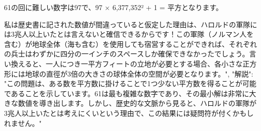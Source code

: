 \documentclass[10pt,a4paper,oneside,openany]{ltjsbook}
\begin{document}
\begin{tcolorbox}[colback=softblue,colframe=primaryblue,title=\textbf{第 129 問：THE BATTLE OF HASTINGS.},arc=2mm,boxrule=1pt,breakable]
{61の回に難しい数字は97で、97 × 6,377,352² + 1 = 平方となります。

私は歴史書に記された数値が間違っていると仮定した理由は、ハロルドの軍隊には3兆人以上いたとは言えないと確信できるからです！この軍隊（ノルマン人を含む）が地球全体（海も含む）を使用しても宿営することができれば、それぞれの兵士はわずかに四分の一インチのスペースしか確保できなかったでしょう。言い換えると、一人につき一平方フィートの立地が必要とする場合、各小さな正方形には地球の直徑が3倍の大きさの球体全体の空間が必要となります。",
"解説": "この問題は、ある数を平方数に掛けることで1つ少ない平方数を得ることが可能であることを示しています。61は最も複雑な数字であり、その最小解は非常に大きな数値を導き出します。しかし、歴史的な文脈から見ると、ハロルドの軍隊が3兆人以上いたとは考えにくいという理由で、この結果には疑問符が付くかもしれません。"
}
\end{tcolorbox}
\end{document}
